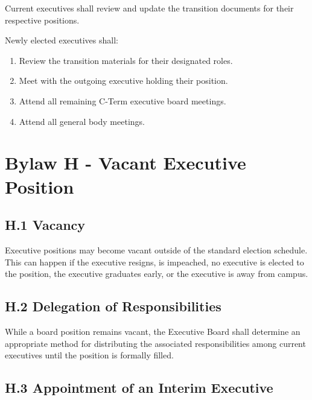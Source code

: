 \documentclass[11pt,a4paper]{article}
\begin{document}
Current executives shall review and update the transition documents for their respective positions.

Newly elected executives shall:
\begin{enumerate}
  \item Review the transition materials for their designated roles.

  \item Meet with the outgoing executive holding their position.

  \item Attend all remaining C-Term executive board meetings.

  \item Attend all general body meetings.
\end{enumerate}

\section*{Bylaw H - Vacant Executive Position}

\subsection*{H.1 Vacancy}
Executive positions may become vacant outside of the standard election schedule. This can happen if the executive resigns, is impeached, no executive is elected to the position, the executive graduates early, or the executive is away from campus.

\subsection*{H.2 Delegation of Responsibilities}
While a board position remains vacant, the Executive Board shall determine an appropriate method for distributing the associated responsibilities among current executives until the position is formally filled.

\subsection*{H.3 Appointment of an Interim Executive}
\end{document}
